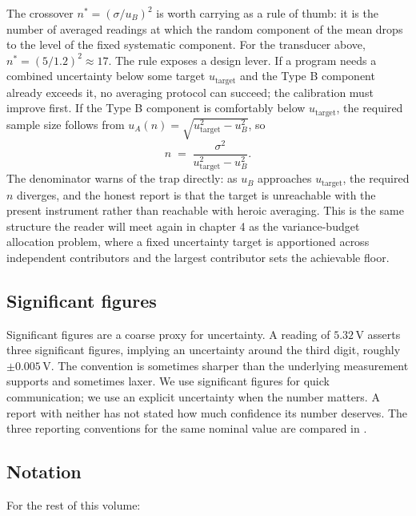 \begin{mastery}
The crossover $n^\ast = (\sigma / u_B)^2$ is worth carrying as a rule
of thumb: it is the number of averaged readings at which the random
component of the mean drops to the level of the fixed systematic
component. For the transducer above, $n^\ast = (5/1.2)^2 \approx 17$.
The rule exposes a design lever. If a program needs a combined
uncertainty below some target $u_{\text{target}}$ and the Type B
component already exceeds it, no averaging protocol can succeed; the
calibration must improve first. If the Type B component is comfortably
below $u_{\text{target}}$, the required sample size follows from
$u_A(n) = \sqrt{u_{\text{target}}^2 - u_B^2}$, so
\[
n \;=\; \frac{\sigma^2}{u_{\text{target}}^2 - u_B^2}.
\]
The denominator warns of the trap directly: as $u_B$ approaches
$u_{\text{target}}$, the required $n$ diverges, and the honest report
is that the target is unreachable with the present instrument rather
than reachable with heroic averaging. This is the same structure the
reader will meet again in chapter 4 as the variance-budget
allocation problem, where a fixed uncertainty target is apportioned
across independent contributors and the largest contributor sets the
achievable floor.
\end{mastery}

\subsection{Significant figures}

Significant figures are a coarse proxy for uncertainty. A reading of
$5.32 \,\si{\volt}$ asserts three significant figures, implying an
uncertainty around the third digit, roughly $\pm 0.005 \,\si{\volt}$.
The convention is sometimes sharper than the underlying measurement
supports and sometimes laxer. We use significant figures for quick
communication; we use an explicit uncertainty when the number
matters. A report with neither has not stated how much confidence its
number deserves. The three reporting conventions for the same
nominal value are compared in .



\subsection{Notation}

For the rest of this volume:

